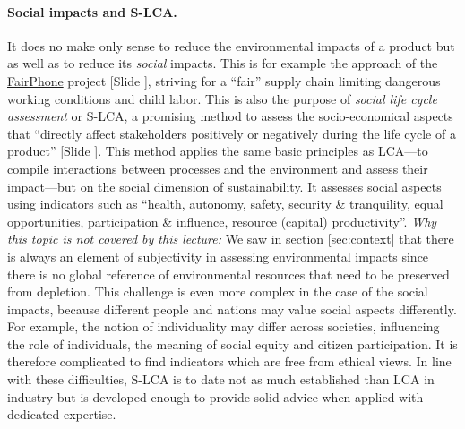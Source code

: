 \documentclass{article}
\newcounter{slide}
\begin{document}
\paragraph{Social impacts and S-LCA.} It does no make only sense to reduce the environmental impacts of a product but as well as to reduce its \emph{social} impacts. This is for example the approach of the \href{https://www.fairphone.com/en/}{FairPhone} project {\color{blue}[Slide ]}, striving for a ``fair'' supply chain limiting dangerous working conditions and child labor. This is also the purpose of \emph{social life cycle assessment} or S-LCA, a promising method to assess the socio-economical aspects that ``directly affect stakeholders positively or negatively during the life cycle of a product'' \cite{andrews2010guidelines} {\color{blue}[Slide ]}. This method applies the same basic principles as LCA---to compile interactions between processes and the environment and assess their impact---but on the social dimension of sustainability. It assesses social aspects using indicators such as ``health, autonomy, safety, security \& tranquility, equal opportunities, participation \& influence, resource (capital) productivity''. \emph{Why this topic is not covered by this lecture:} We saw in section \ref{sec:context} that there is always an element of subjectivity in assessing environmental impacts since there is no global reference of environmental resources that need to be preserved from depletion. This challenge is even more complex in the case of the social impacts, because different people and nations may value social aspects differently. For example, the notion of individuality may differ across societies, influencing the role of individuals, the meaning of social equity and citizen participation. It is therefore complicated to find indicators which are free from ethical views. In line with these difficulties, S-LCA is to date not as much established than LCA in industry but is developed enough to provide solid advice when applied with dedicated expertise. 
\end{document}
